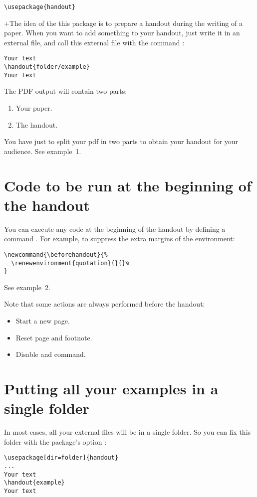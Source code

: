 \documentclass{ltxdockit}[2011/03/25]
\begin{document}
\begin{verbatim}
\usepackage{handout}
\end{verbatim}
+The idea of the this package is to prepare a handout during the writing of a paper. When you want to add something to your handout, just write it in an external file, and call this external file with the command :

\begin{verbatim}
Your text
\handout{folder/example}
Your text
\end{verbatim}

The PDF output will contain two parts:
\begin{enumerate}
  \item Your paper.
  \item The handout.
\end{enumerate}

You have just to split your pdf in two parts to obtain your handout for your audience.
See example~1.

\section{Code to be run at the beginning of the handout}

You can execute any code at the beginning of the handout by defining a command . For example, to suppress the extra margins of the  environment:
\begin{verbatim}
\newcommand{\beforehandout}{%
  \renewenvironment{quotation}{}{}%
}
\end{verbatim}
See example~2.

Note that some actions are always performed before the handout:
\begin{itemize}
  \item Start a new page.
  \item Reset page and footnote.
  \item Disable  and  command.
\end{itemize}

\section{Putting all your examples in a single folder}

In most cases, all your external files will be in a single folder. So you can fix this folder with the package's option :
\begin{verbatim}
\usepackage[dir=folder]{handout}
...
Your text
\handout{example}
Your text
\end{verbatim}
\end{document}

